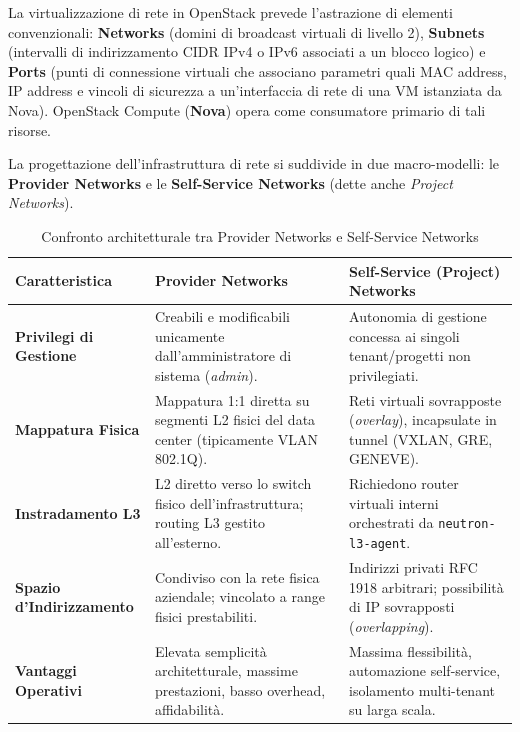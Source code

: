 \documentclass[11pt, a4paper]{article}
\begin{document}
La virtualizzazione di rete in OpenStack prevede l'astrazione di elementi convenzionali: \textbf{Networks} (domini di broadcast virtuali di livello 2), \textbf{Subnets} (intervalli di indirizzamento CIDR IPv4 o IPv6 associati a un blocco logico) e \textbf{Ports} (punti di connessione virtuali che associano parametri quali MAC address, IP address e vincoli di sicurezza a un'interfaccia di rete di una VM istanziata da Nova). OpenStack Compute (\textbf{Nova}) opera come consumatore primario di tali risorse.

La progettazione dell'infrastruttura di rete si suddivide in due macro-modelli: le \textbf{Provider Networks} e le \textbf{Self-Service Networks} (dette anche \emph{Project Networks}).

\begin{table}[H]
\centering
\small
\caption{Confronto architetturale tra Provider Networks e Self-Service Networks}
\label{tab:provider_vs_selfservice}
\begin{tabularx}{\textwidth}{l p{6.5cm} p{6.5cm}}
\toprule
\textbf{Caratteristica} & \textbf{Provider Networks} & \textbf{Self-Service (Project) Networks} \\
\midrule
\textbf{Privilegi di Gestione} & Creabili e modificabili unicamente dall'amministratore di sistema (\emph{admin}). & Autonomia di gestione concessa ai singoli tenant/progetti non privilegiati. \\
\addlinespace
\textbf{Mappatura Fisica} & Mappatura 1:1 diretta su segmenti L2 fisici del data center (tipicamente VLAN 802.1Q). & Reti virtuali sovrapposte (\emph{overlay}), incapsulate in tunnel (VXLAN, GRE, GENEVE). \\
\addlinespace
\textbf{Instradamento L3} & L2 diretto verso lo switch fisico dell'infrastruttura; routing L3 gestito all'esterno. & Richiedono router virtuali interni orchestrati da \texttt{neutron-l3-agent}. \\
\addlinespace
\textbf{Spazio d'Indirizzamento} & Condiviso con la rete fisica aziendale; vincolato a range fisici prestabiliti. & Indirizzi privati RFC 1918 arbitrari; possibilità di IP sovrapposti (\emph{overlapping}). \\
\addlinespace
\textbf{Vantaggi Operativi} & Elevata semplicità architetturale, massime prestazioni, basso overhead, affidabilità. & Massima flessibilità, automazione self-service, isolamento multi-tenant su larga scala. \\
\bottomrule
\end{tabularx}
\end{table}
\end{document}
